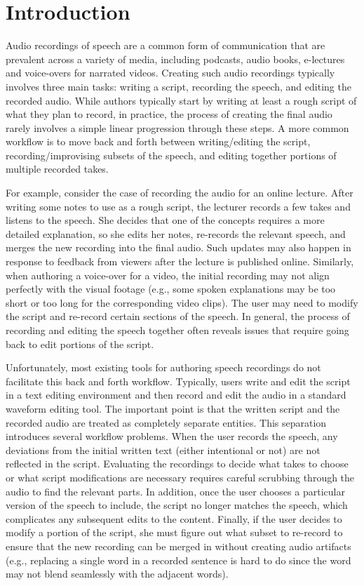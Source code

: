 \section{Introduction}

Audio recordings of speech are a common form of communication that are prevalent across a variety of media, including podcasts, audio books, e-lectures and voice-overs for narrated videos.
%
Creating such audio recordings typically involves three main tasks: writing a script, recording the speech, and editing the recorded audio. 
%
While authors typically start by writing at least a rough script of what they plan to record, in practice, the process of creating the final audio rarely involves a simple linear progression through these steps. A more common workflow is to move back and forth between writing/editing the script, recording/improvising subsets of the speech, and editing together portions of multiple recorded takes.

For example, consider the case of recording the audio for an online lecture. After writing some notes to use as a rough script, the lecturer records a few takes and listens to the speech. She decides that one of the concepts requires a more detailed explanation, so she edits her notes, re-records the relevant speech, and merges the new recording into the final audio. Such updates may also happen in response to feedback from viewers after the lecture is published online. Similarly, when authoring a voice-over for a video, the initial recording may not align perfectly with the visual footage (e.g., some spoken explanations may be too short or too long for the corresponding video clips). The user may need to modify the script and re-record certain sections of the speech. In general, the process of recording and editing the speech together often reveals issues that require going back to edit portions of the script.

Unfortunately, most existing tools for authoring speech recordings do not facilitate this back and forth workflow. Typically, users write and edit the script in a text editing environment and then record and edit the audio in a standard waveform editing tool. The important point is that the written script and the recorded audio are treated as completely separate entities.
%
This separation introduces several workflow problems. When the user records the speech, any deviations from the initial written text (either intentional or not) are not reflected in the script. Evaluating the recordings to decide what takes to choose or what script modifications are necessary requires careful scrubbing through the audio to find the relevant parts. In addition, once the user chooses a particular version of the speech to include, the script no longer matches the speech, which complicates any subsequent edits to the content. Finally, if the user decides to modify a portion of the script, she must figure out what subset to re-record to ensure that the new recording can be merged in without creating audio artifacts (e.g., replacing a single word in a recorded sentence is hard to do since the word may not blend seamlessly with the adjacent words).

